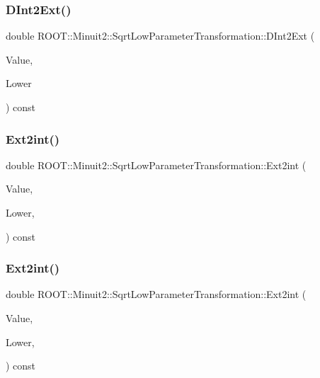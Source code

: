 \subsubsection{\texorpdfstring{DInt2Ext()}{DInt2Ext()}\hspace{0.1cm}{\footnotesize\ttfamily [2/2]}}
{\footnotesize\ttfamily double R\+O\+O\+T\+::\+Minuit2\+::\+Sqrt\+Low\+Parameter\+Transformation\+::\+D\+Int2\+Ext (\begin{DoxyParamCaption}\item[{double}]{Value,  }\item[{double}]{Lower }\end{DoxyParamCaption}) const}

\mbox{\label{classROOT_1_1Minuit2_1_1SqrtLowParameterTransformation_a2035002e75f51cafc5e5d8afc05913e6}} 
\subsubsection{\texorpdfstring{Ext2int()}{Ext2int()}\hspace{0.1cm}{\footnotesize\ttfamily [1/2]}}
{\footnotesize\ttfamily double R\+O\+O\+T\+::\+Minuit2\+::\+Sqrt\+Low\+Parameter\+Transformation\+::\+Ext2int (\begin{DoxyParamCaption}\item[{double}]{Value,  }\item[{double}]{Lower,  }\item[{const \mbox{\hyperlink{classROOT_1_1Minuit2_1_1MnMachinePrecision}{Mn\+Machine\+Precision}} \&}]{ }\end{DoxyParamCaption}) const}

\mbox{\label{classROOT_1_1Minuit2_1_1SqrtLowParameterTransformation_a2035002e75f51cafc5e5d8afc05913e6}} 
\subsubsection{\texorpdfstring{Ext2int()}{Ext2int()}\hspace{0.1cm}{\footnotesize\ttfamily [2/2]}}
{\footnotesize\ttfamily double R\+O\+O\+T\+::\+Minuit2\+::\+Sqrt\+Low\+Parameter\+Transformation\+::\+Ext2int (\begin{DoxyParamCaption}\item[{double}]{Value,  }\item[{double}]{Lower,  }\item[{const \mbox{\hyperlink{classROOT_1_1Minuit2_1_1MnMachinePrecision}{Mn\+Machine\+Precision}} \&}]{ }\end{DoxyParamCaption}) const}

